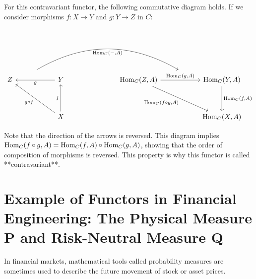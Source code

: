 \documentclass[uplatex,a4j,12pt,dvipdfmx]{jsarticle}
\begin{document}
For this contravariant functor, the following commutative diagram holds.
If we consider morphisms $f: X \to Y$ and $g: Y \to Z$ in $C$:

\[
	\begin{tikzcd}
		& {} \arrow[rrrrr, "{{\rm Hom}_{C}(-, A)}"', bend left, shift right=8] &           &  &  &                          & {} &                          \\
		Z &                                 & Y \arrow[ll, "g"]          &  &  & {{\rm Hom}_{C}(Z,A)} \arrow[rr, "{{\rm Hom}_{C}(g, A)}"] \arrow[rrdd, "{{\rm Hom}_{C}(f \circ g, A)}"'] &  & {{\rm Hom}_{C}(Y,A)} \arrow[dd, "{{\rm Hom}_{C}(f,A)}"] \\
		&                                 &                            &  &  &                          &  &                          \\
		&                                 & X \arrow[uu, "f"] \arrow[lluu, "g \circ f"] &  &  &                          &  & {{\rm Hom}_{C}(X,A)}
	\end{tikzcd}
\]

Note that the direction of the arrows is reversed.
This diagram implies ${\rm Hom}_{C}(f \circ g, A) = {\rm Hom}_{C}(f,A) \circ {\rm Hom}_{C}(g,A)$, showing that the order of composition of morphisms is reversed. This property is why this functor is called **contravariant**.



\section{Example of Functors in Financial Engineering: The Physical Measure P and Risk-Neutral Measure Q}

In financial markets, mathematical tools called probability measures are sometimes used to describe the future movement of stock or asset prices.
\end{document}
